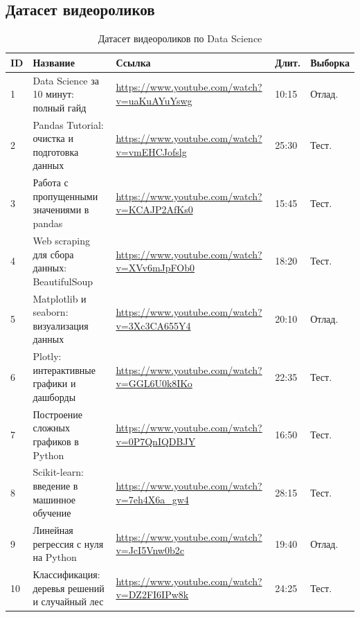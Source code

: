 \documentclass[oneside,a4paper,14pt]{extarticle}
\begin{document}
\subsection{Датасет видеороликов}
\begin{table}[H]
\centering
\caption{Датасет видеороликов по Data Science}
\begin{tabular}{|p{0.5cm}|p{6cm}|p{6cm}|p{1.5cm}|p{1cm}|}
\hline
\textbf{ID} & \textbf{Название} & \textbf{Ссылка} & \textbf{Длит.} & \textbf{Выборка} \\ \hline
1 & Data Science за 10 минут: полный гайд & \url{https://www.youtube.com/watch?v=uaKuAYuYswg} & 10:15 & Отлад. \\ \hline
2 & Pandas Tutorial: очистка и подготовка данных & \url{https://www.youtube.com/watch?v=vmEHCJofslg} & 25:30 & Тест. \\ \hline
3 & Работа с пропущенными значениями в pandas & \url{https://www.youtube.com/watch?v=KCAJP2AfKs0} & 15:45 & Тест. \\ \hline
4 & Web scraping для сбора данных: BeautifulSoup & \url{https://www.youtube.com/watch?v=XVv6mJpFOb0} & 18:20 & Тест. \\ \hline
5 & Matplotlib и seaborn: визуализация данных & \url{https://www.youtube.com/watch?v=3Xc3CA655Y4} & 20:10 & Отлад. \\ \hline
6 & Plotly: интерактивные графики и дашборды & \url{https://www.youtube.com/watch?v=GGL6U0k8IKo} & 22:35 & Тест. \\ \hline
7 & Построение сложных графиков в Python & \url{https://www.youtube.com/watch?v=0P7QnIQDBJY} & 16:50 & Тест. \\ \hline
8 & Scikit-learn: введение в машинное обучение & \url{https://www.youtube.com/watch?v=7eh4X6a_gw4} & 28:15 & Тест. \\ \hline
9 & Линейная регрессия с нуля на Python & \url{https://www.youtube.com/watch?v=JcI5Vnw0b2c} & 19:40 & Отлад. \\ \hline
10 & Классификация: деревья решений и случайный лес & \url{https://www.youtube.com/watch?v=DZ2FI6IPw8k} & 24:25 & Тест. \\ \hline
\end{tabular}
\end{table}
\end{document}
